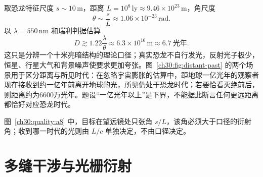 \begin{xesolution}
\begin{center}\begin{minipage}{.96\linewidth}\centering
{}
\end{minipage}\end{center}

取恐龙特征尺度 $s\sim10\,\mathrm m$，距离 $L=10^8\,\mathrm{ly}\approx9.46\times10^{23}\,\mathrm m$，角尺度
\[
 \theta\sim\frac sL\approx1.06\times10^{-23}\,\mathrm{rad}.
\]
以 $\lambda=550\,\mathrm{nm}$ 和瑞利判据估算
\[
 D\gtrsim1.22\frac\lambda\theta
 \approx6.3\times10^{16}\,\mathrm m
 \approx\boxed{6.7\ \text{光年}}.
\]
这只是分辨一个十米亮暗结构的理论口径；真实恐龙不自行发光，反射光子极少，恒星、行星大气和背景噪声使要求更加夸张。图~\ref{ch30:fig:distant-past} 的两个场景用于区分距离与所见时代：在忽略宇宙膨胀的估算中，距地球一亿光年的观察者现在接收到约一亿年前离开地球的光，所见仍处于恐龙时代；若要恰看灭绝前后，则距离约为6600万光年。题设“一亿光年以上”是下界，不能据此断言任何更远距离都恰好对应恐龙时代。

图~\ref{ch30:quality:a8} 中，目标在望远镜处只张角 $s/L$，该角必须大于口径的衍射角；收到哪一时代的光则由 $L/c$ 单独决定，不由口径决定。
\end{xesolution}

\section{多缝干涉与光栅衍射}



